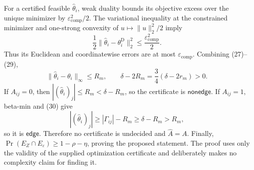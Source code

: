 For a certified feasible \(\widehat\theta_i\), weak duality bounds its objective excess over the unique minimizer by \(\varepsilon_{\mathrm{comp}}^2/2\).  The variational inequality at the constrained minimizer and one-strong convexity of \(u\mapsto\lVert u\rVert_2^2/2\) imply
\[
 \frac12\lVert\widehat\theta_i-\theta_i^{\mathrm D}\rVert_2^2
 \le\frac{\varepsilon_{\mathrm{comp}}^2}{2}.
 \tag{29}
\]
Thus its Euclidean and coordinatewise errors are at most \(\varepsilon_{\mathrm{comp}}\).  Combining (27)--(29),
\[
 \lVert\widehat\theta_i-\theta_i\rVert_\infty\le R_m,
 \qquad
 \delta-2R_m=\frac34(\delta-2r_m)>0.
 \tag{30}
\]
If \(A_{ij}=0\), then \(|(\widehat\theta_i)_j|\le R_m<\delta-R_m\), so the certificate is \(\mathsf{nonedge}\).  If \(A_{ij}=1\), beta-min and (30) give
\[
 |(\widehat\theta_i)_j|\ge|\Gamma_{ij}|-R_m
 \ge\delta-R_m>R_m,
\]
so it is \(\mathsf{edge}\).  Therefore no certificate is undecided and \(\widehat A=A\).  Finally, \(\Pr(E_Z\cap E_\varepsilon)\ge1-\rho-\eta\), proving the proposed statement.  The proof uses only the validity of the supplied optimization certificate and deliberately makes no complexity claim for finding it.